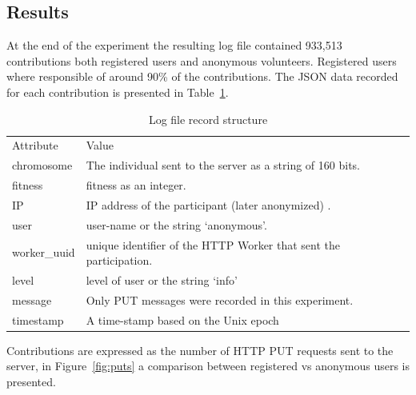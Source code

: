 \documentclass{llncs}
\begin{document}
  

\subsection{Results}
\label{sec:results}
At the end of the experiment the resulting log file contained 933,513 contributions both 
registered users and anonymous volunteers. Registered users where responsible of around
90\% of the contributions. The JSON data recorded for each contribution is  presented 
in Table~\ref{tab:record}.  
\begin{table}
  \small
  \caption{ Log file record structure}
  \label{tab:record} 
  \centering
  \small
  \begin{tabular}{l  l}
    \hline\noalign{\smallskip}
    Attribute & Value \\
    \noalign{\smallskip}\hline\noalign{\smallskip}
    chromosome   & The individual sent to the server as a string of 160 bits.  \\ \hline
    fitness & fitness as an integer.  \\ \hline
    IP & IP address of the participant (later anonymized) .\\ \hline
    user & user-name or the string `anonymous'.  \\ \hline
    worker\_uuid & unique identifier of the HTTP Worker that sent the participation.   \\ \hline
    level &  level of user or the string `info' \\ \hline
    message & Only PUT messages were recorded in this experiment. \\ \hline
    timestamp & A time-stamp based on the Unix epoch\\ \hline
  \end{tabular}
\end{table}
Contributions are expressed as the number of HTTP PUT requests sent to the server, 
in Figure~\ref{fig:puts} a comparison between registered vs anonymous users is 
presented.
\end{document}
